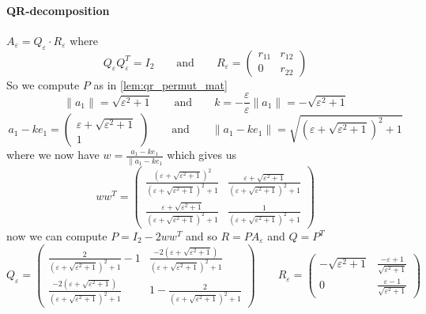 \paragraph{QR-decomposition} \(A_\varepsilon = Q_\varepsilon \cdot R_\varepsilon\) where
\[Q_\varepsilon Q_\varepsilon^T = I_2 \qquad\text{and}\qquad R_\varepsilon = \begin{pmatrix}r_{11} & r_{12}\\ 0 & r_{22}\end{pmatrix}\]
So we compute \(P\) as in \cref{lem:qr_permut_mat}
\[\|a_1\| = \sqrt{\varepsilon^2 + 1} \qquad\text{and}\qquad k = -\frac{\varepsilon}{\varepsilon} \|a_1\| = -\sqrt{\varepsilon^2 + 1}\]
\[a_1 - ke_1 = \begin{pmatrix}\varepsilon + \sqrt{\varepsilon^2 + 1}\\1\end{pmatrix} \qquad\text{and}\qquad \|a_1 - ke_1\| = \sqrt{(\varepsilon + \sqrt{\varepsilon^2 + 1})^2 + 1}\]
where we now have \(w = \frac{a_1 - ke_1}{\|a_1 - ke_1}\) which gives us
\[ww^T = \begin{pmatrix}
   \frac{(\varepsilon + \sqrt{\varepsilon^2 + 1})^2}{(\varepsilon + \sqrt{\varepsilon^2 + 1})^2 + 1} & \frac{\varepsilon + \sqrt{\varepsilon^2 + 1}}{(\varepsilon + \sqrt{\varepsilon^2 + 1})^2 + 1}\\
   \frac{\varepsilon + \sqrt{\varepsilon^2 + 1}}{(\varepsilon + \sqrt{\varepsilon^2 + 1})^2 + 1} & \frac{1}{(\varepsilon + \sqrt{\varepsilon^2 + 1})^2 + 1}
\end{pmatrix}\]
now we can compute \(P = I_2 - 2ww^T\) and so \(R = PA_\varepsilon\) and \(Q = P^T\)
\[Q_\varepsilon = \begin{pmatrix}
      \frac{2}{(\varepsilon + \sqrt{\varepsilon^2 + 1})^2 + 1}-1 & \frac{-2(\varepsilon + \sqrt{\varepsilon^2+1})}{(\varepsilon + \sqrt{\varepsilon^2 + 1})^2 + 1}\\
   \frac{-2(\varepsilon + \sqrt{\varepsilon^2+1})}{(\varepsilon + \sqrt{\varepsilon^2 + 1})^2 + 1} & 1- \frac{2}{(\varepsilon + \sqrt{\varepsilon^2 + 1})^2 + 1}
\end{pmatrix} \qquad R_\varepsilon = \begin{pmatrix}
   -\sqrt{\varepsilon^2 + 1} & \frac{-\varepsilon + 1}{\sqrt{\varepsilon^2 + 1}}\\
   0 & \frac{\varepsilon - 1}{\sqrt{\varepsilon^2 + 1}}
\end{pmatrix}\]

